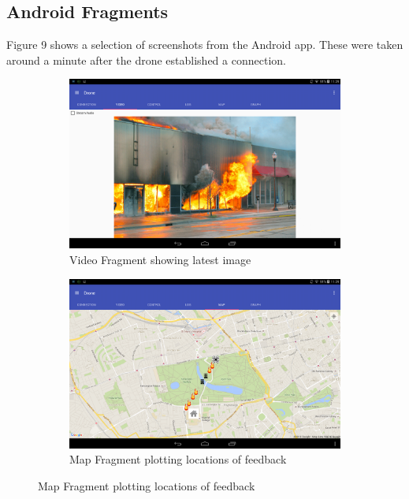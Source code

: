 \documentclass{article}
\begin{document}
\subsection{Android Fragments}
Figure 9 shows a selection of screenshots from the Android app. These were taken around a minute after the drone established a connection.
\begin{landscape}
\begin{figure}[h]
\caption{Screenshots of the Android App\label{fig:AndroidScreenshots}}
\centering
\begin{subfigure}[b]{.45\linewidth}
\includegraphics[width=\linewidth]{VideoFragment}
\caption{Video Fragment showing latest image}
\end{subfigure}
\begin{subfigure}[b]{.45\linewidth}
\includegraphics[width=\linewidth]{MapFragment}
\caption{Map Fragment plotting locations of feedback}
\end{subfigure}


\end{figure}
\end{landscape}
\end{document}
